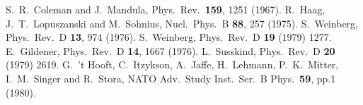 \documentclass[final,3p,times,pdflatex]{elsarticle}
\begin{document}
\begin{thebibliography}{100}
  S.~R.~Coleman and J.~Mandula,
  Phys.\ Rev.\  {\bf 159}, 1251 (1967).
  R.~Haag, J.~T.~Lopuszanski and M.~Sohnius,
  Nucl.\ Phys.\ B {\bf 88}, 257 (1975).
  S.~Weinberg,
  Phys.\ Rev.\ D {\bf 13}, 974 (1976).
  S.~Weinberg,
  Phys.\ Rev.\ D {\bf 19} (1979) 1277.
  E.~Gildener,
  Phys.\ Rev.\ D {\bf 14}, 1667 (1976).
  L.~Susskind,
  Phys.\ Rev.\ D {\bf 20} (1979) 2619.
  G.~'t Hooft, C.~Itzykson, A.~Jaffe, H.~Lehmann, P.~K.~Mitter, I.~M.~Singer and R.~Stora,
  NATO Adv.\ Study Inst.\ Ser.\ B Phys.\  {\bf 59}, pp.1 (1980).


\end{thebibliography}
\end{document}
